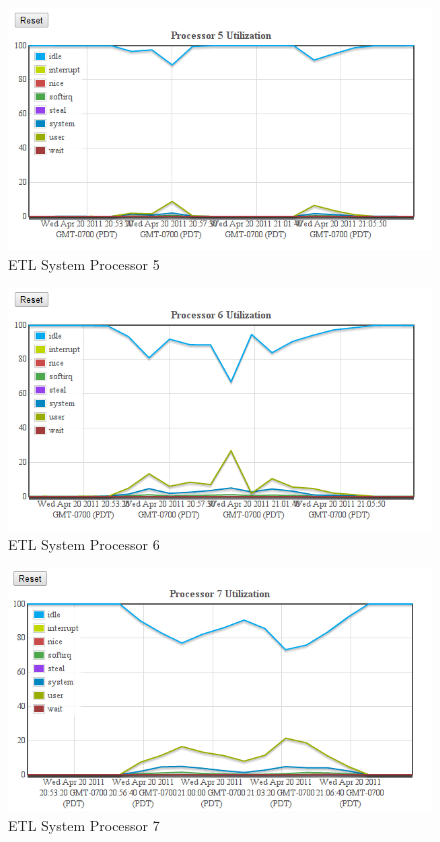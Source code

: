 \documentclass[twocolumn,letterpaper]{article}
\begin{document}
\begin{figure}[ht]
  \begin{center}
    \includegraphics[scale=0.37]{collectd-c10-cpu-05}
  \end{center}
  \caption{ETL System Processor 5}
\end{figure}

\begin{figure}[ht]
  \begin{center}
    \includegraphics[scale=0.37]{collectd-c10-cpu-06}
  \end{center}
  \caption{ETL System Processor 6}
\end{figure}

\begin{figure}[ht]
  \begin{center}
    \includegraphics[scale=0.37]{collectd-c10-cpu-07}
  \end{center}
  \caption{ETL System Processor 7}
  \label{collectd-c10-cpu07}
\end{figure}
\end{document}
